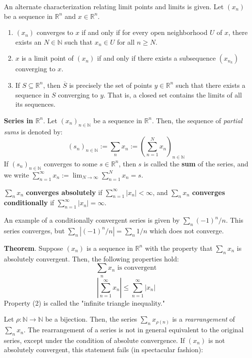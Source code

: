An alternate characterization relating limit points and limits is given. Let $(x_n)$ be a sequence in $\mathbb{R}^n$ and $x\in\mathbb{R}^n$.
\vspace{-1em}
\begin{enumerate}
    \item[(1)] $(x_n)$ converges to $x$ if and only if for every open neighborhood $U$ of $x$, there exists an $N\in\mathbb{N}$ such that $x_n\in U$ for all $n\geq N$.
    \item[(2)] $x$ is a limit point of $(x_n)$ if and only if there exists a subsequence $(x_{n_k})$ converging to $x$.
    \item[(3)] If $S\subseteq\mathbb{R}^n$, then $\overline{S}$ is precisely the set of points $y\in\mathbb{R}^n$ such that there exists a sequence in $S$ converging to $y$. That is, a closed set contains the limits of all its sequences.
\end{enumerate}

\begin{framed}
    \textbf{Series in $\mathbb{R}^n$}. Let $(x_n)_{n\in\mathbb{N}}$ be a sequence in $\mathbb{R}^n$. Then, the sequence of \textit{partial sums} is denoted by: \[(s_n)_{n\in\mathbb{N}}:=\sum_n x_n :=\left(\displaystyle\sum_{n=1}^N x_n\right)_{n\in\mathbb{N}}\] If $(s_n)_{n\in\mathbb{N}}$ converges to some $s\in\mathbb{R}^n$, then $s$ is called the \textbf{sum} of the series, and we write $\displaystyle\sum_{n=1}^\infty x_n :=\displaystyle\lim_{N\to\infty}\sum_{n=1}^N x_n = s$.

    $\sum_n x_n$ \textbf{converges absolutely} if $\displaystyle\sum_{n=1}^\infty |x_n|<\infty$, and $\sum_n x_n$ \textbf{converges conditionally} if $\displaystyle\sum_{n=1}^\infty|x_n| = \infty$.
\end{framed}

An example of a conditionally convergent series is given by $\sum_n (-1)^n/n$. This series converges, but $\sum_n|(-1)^n/n| = \sum_n 1/n$ which does not converge.

\textbf{Theorem}. Suppose $(x_n)$ is a sequence in $\mathbb{R}^n$ with the property that $\sum_n x_n$ is absolutely convergent. Then, the following properties hold:
\[\sum_n x_n \text{ is convergent}\tag{1}\] \[\left|\displaystyle\sum_{n=1}^\infty x_n\right|\leq \displaystyle\sum_{n=1}^\infty\left|x_n\right|\tag{2}\] Property (2) is called the "infinite triangle inequality."

Let $\rho:\mathbb{N}\to\mathbb{N}$ be a bijection. Then, the series $\sum_n x_{\rho(n)}$ is a \textit{rearrangement} of $\sum_n x_n$. The rearrangement of a series is not in general equivalent to the original series, except under the condition of absolute convergence. If $(x_n)$ is not absolutely convergent, this statement fails (in spectacular fashion):


